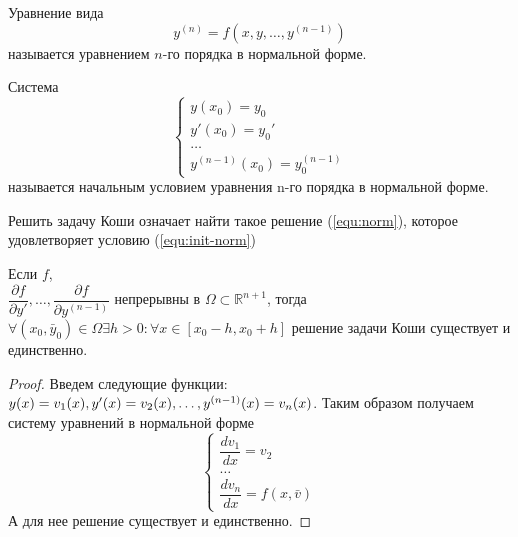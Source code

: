 \begin{definition}
	Уравнение вида
	\begin{equation}
		\label{equ:norm}
		y^{(n)} = f(x, y, \dots, y^{(n-1)})
	\end{equation}
	называется уравнением $n$-го порядка в нормальной форме.
\end{definition}

\begin{definition}
	Система
	\begin{equation}
		\label{equ:init-norm}
		\begin{cases*}
			y(x_0) = y_0\\
			y'(x_0) = y_0'\\
			\dots \\
			y^{(n-1)}(x_0) = y^{(n-1)}_0
		\end{cases*}
	\end{equation}
	называется начальным условием уравнения n-го порядка в нормальной форме.
\end{definition}

\begin{proposition}
	Решить задачу Коши означает найти такое решение (\ref{equ:norm}), которое удовлетворяет условию (\ref{equ:init-norm})
\end{proposition}

\begin{theorem}
	Если $f$, \\ $\dfrac{\partial f}{\partial y'}, \dots, \dfrac{\partial f}{\partial y^{(n-1)}}$ непрерывны в $\Omega \subset \mathbb{R}^{n+1}$, тогда $\forall (x_0, \bar{y}_0) \in \Omega \exists h > 0: \forall x\in [x_0 - h, x_0 + h]$ решение задачи Коши существует и единственно.
\end{theorem}

\begin{proof}
	Введем следующие функции: $y(x) = v_1(x), y'(x) = v_2(x), \dots, y^{(n-1)}(x) \hm= v_n(x)$. Таким образом получаем систему уравнений в нормальной форме
	\begin{equation}
		\begin{cases*}
			\dfrac{dv_1}{dx} = v_2\\
			\dots\\
			\dfrac{dv_n}{dx} = f(x, \bar{v})
		\end{cases*}
	\end{equation}
	А для нее решение существует и единственно.
\end{proof}
